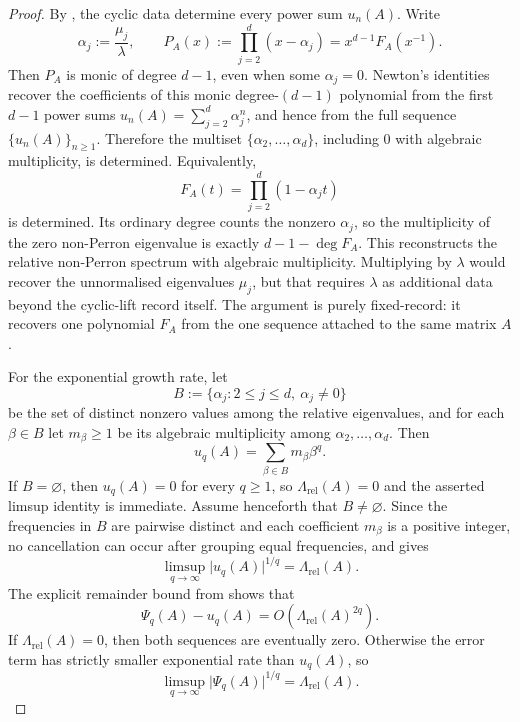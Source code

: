 \documentclass[11pt,a4paper]{amsart}
\theoremstyle{plain}
\theoremstyle{definition}
\theoremstyle{remark}
\newcommand{\abs}[1]{\lvert #1 \rvert}
\begin{document}
\begin{proof}
  By , the cyclic
  data determine every power sum \(u_n(A)\). Write
  \[
    \alpha_j:=\frac{\mu_j}{\lambda},
    \qquad
    P_A(x):=\prod_{j=2}^d(x-\alpha_j)
    =x^{d-1}F_A(x^{-1}).
  \]
  Then \(P_A\) is monic of degree \(d-1\), even when some
  \(\alpha_j=0\). Newton's identities recover the coefficients of this
  monic degree-\((d-1)\) polynomial from the first \(d-1\) power sums
  \(u_n(A)=\sum_{j=2}^d\alpha_j^n\), and hence from the full sequence
  \(\{u_n(A)\}_{n\ge 1}\). Therefore the multiset
  \(\{\alpha_2,\dots,\alpha_d\}\), including \(0\) with algebraic
  multiplicity, is determined. Equivalently,
  \[
    F_A(t)=\prod_{j=2}^d(1-\alpha_j t)
  \]
  is determined. Its ordinary degree counts the nonzero \(\alpha_j\), so
  the multiplicity of the zero non-Perron eigenvalue is exactly
  \(d-1-\deg F_A\). This reconstructs the relative non-Perron spectrum
  with algebraic multiplicity. Multiplying by \(\lambda\) would recover
  the unnormalised eigenvalues \(\mu_j\), but that requires \(\lambda\)
  as additional data beyond the cyclic-lift record itself. The argument
  is purely fixed-record: it recovers one polynomial \(F_A\) from the
  one sequence attached to the same matrix \(A\).

  For the exponential growth rate, let
  \[
    B:=\{\alpha_j:2\le j\le d,\ \alpha_j\neq 0\}
  \]
  be the set of distinct nonzero values among the relative eigenvalues,
  and for each \(\beta\in B\) let \(m_\beta\ge 1\) be its algebraic
  multiplicity among \(\alpha_2,\dots,\alpha_d\). Then
  \[
    u_q(A)=\sum_{\beta\in B}m_\beta\beta^q.
  \]
  If \(B=\varnothing\), then \(u_q(A)=0\) for every \(q\ge 1\), so
  \(\Lambda_{\mathrm{rel}}(A)=0\) and the asserted limsup identity is
  immediate. Assume henceforth that \(B\neq\varnothing\). Since the
  frequencies in \(B\) are pairwise distinct and each coefficient
  \(m_\beta\) is a positive integer, no cancellation can occur after
  grouping equal frequencies, and
   gives
  \[
    \limsup_{q\to\infty}\abs{u_q(A)}^{1/q}
    =\Lambda_{\mathrm{rel}}(A).
  \]
  The explicit remainder bound from
   shows that
  \[
    \Psi_q(A)-u_q(A)
    =O\!\left(\Lambda_{\mathrm{rel}}(A)^{2q}\right).
  \]
  If \(\Lambda_{\mathrm{rel}}(A)=0\), then both sequences are
  eventually zero. Otherwise the error term has strictly smaller
  exponential rate than \(u_q(A)\), so
  \[
    \limsup_{q\to\infty}\abs{\Psi_q(A)}^{1/q}
    =\Lambda_{\mathrm{rel}}(A).
  \]
\end{proof}
\end{document}

